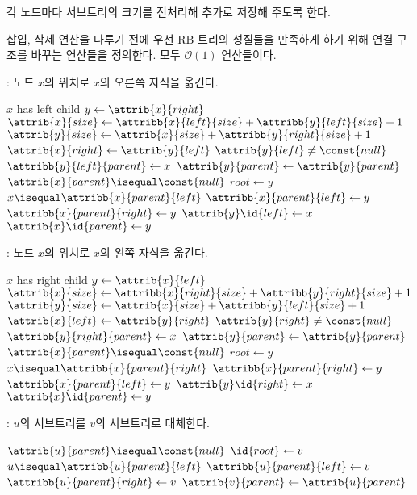 각 노드마다 서브트리의 크기를 전처리해 추가로 저장해 주도록 한다.

삽입, 삭제 연산을 다루기 전에 우선 RB 트리의 성질들을 만족하게 하기 위해 연결 구조를 바꾸는 연산들을 정의한다. 모두 $\mathcal{O}\left(1\right)$ 연산들이다.

: 노드 $x$의 위치로 $x$의 오른쪽 자식을 옮긴다.
\begin{codebox}
\li \If $x$ has left child \Then
\li \Return
    \End
\li $y \gets \attrib{x}{right}$
\li $\attrib{x}{size} \gets \attribb{x}{left}{size} + \attribb{y}{left}{size} + 1$
\li $\attrib{y}{size} \gets \attrib{x}{size} + \attribb{y}{right}{size} + 1$
\li $\attrib{x}{right} \gets \attrib{y}{left}$
\li \If $\attrib{y}{left} \neq \const{null}$ \Then
\li     $\attribb{y}{left}{parent} \gets x$
    \End
\li $\attrib{y}{parent} \gets \attrib{y}{parent}$
\li \If $\attrib{x}{parent} \isequal \const{null}$ \Then
\li     $root \gets y$
\li \ElseIf $x \isequal \attribb{x}{parent}{left}$ \Then
\li     $\attribb{x}{parent}{left} \gets y$
\li \ElseNoIf
\li     $\attribb{x}{parent}{right} \gets y$
    \End
\li $\attrib{y}\id{left} \gets x$
\li $\attrib{x}\id{parent} \gets y$
\end{codebox}

: 노드 $x$의 위치로 $x$의 왼쪽 자식을 옮긴다.
\begin{codebox}
\li \If $x$ has right child \Then
\li \Return
    \End
\li $y \gets \attrib{x}{left}$
\li $\attrib{x}{size} \gets \attribb{x}{right}{size} + \attribb{y}{right}{size} + 1$
\li $\attrib{y}{size} \gets \attrib{x}{size} + \attribb{y}{left}{size} + 1$
\li $\attrib{x}{left} \gets \attrib{y}{right}$
\li \If $\attrib{y}{right} \neq \const{null}$ \Then
\li     $\attribb{y}{right}{parent} \gets x$
    \End
\li $\attrib{y}{parent} \gets \attrib{y}{parent}$
\li \If $\attrib{x}{parent} \isequal \const{null}$ \Then
\li     $root \gets y$
\li \ElseIf $x \isequal \attribb{x}{parent}{right}$ \Then
\li     $\attribb{x}{parent}{right} \gets y$
\li \ElseNoIf
\li     $\attribb{x}{parent}{left} \gets y$
    \End
\li $\attrib{y}\id{right} \gets x$
\li $\attrib{x}\id{parent} \gets y$
\end{codebox}

: $u$의 서브트리를 $v$의 서브트리로 대체한다.

\begin{codebox}
\li \If $\attrib{u}{parent} \isequal \const{null}$ \Then
\li     $\id{root} \gets v$
\li \ElseIf $u \isequal \attribb{u}{parent}{left}$ \Then
\li     $\attribb{u}{parent}{left} \gets v$
\li \ElseNoIf
\li     $\attribb{u}{parent}{right} \gets v$
    \End
\li $\attrib{v}{parent} \gets \attrib{u}{parent}$
\end{codebox}

